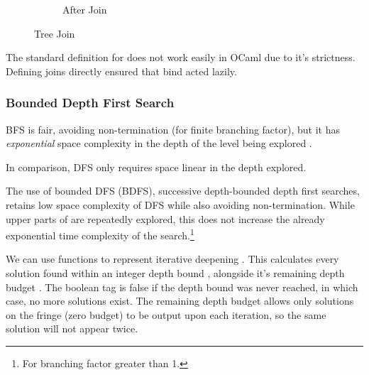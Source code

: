\begin{figure}[h]
{{\begin{subfigure}{0.45\textwidth}
\caption{After Join}
\end{subfigure}}}

\caption{Tree Join}
\label{fig:BFSJoin}
\end{figure}
The standard definition for  \cite{Bunches} does not work easily in OCaml due to it's strictness. Defining joins directly ensured that bind acted lazily.

\subsubsection{Bounded Depth First Search}
BFS is fair, avoiding non-termination (for finite branching factor), but it has \textit{exponential} space complexity in the depth of the level being explored \cite{NorvigAI}.

In comparison, DFS only requires space linear in the depth explored.

The use of bounded DFS (BDFS), successive depth-bounded depth first searches, retains low space complexity of DFS while also avoiding non-termination. While upper parts of are repeatedly explored, this does not increase the already exponential time complexity of the search.\footnote{For branching factor greater than 1.} 

We can use functions  to represent iterative deepening \cite{SearchAlgebra}. This calculates every solution found within an integer depth bound , alongside it's remaining depth budget . The boolean tag is false if the depth bound was never reached, in which case, no more solutions exist. The remaining depth budget allows only solutions on the fringe (zero budget) to be output upon each iteration, so the same solution will not appear twice.

